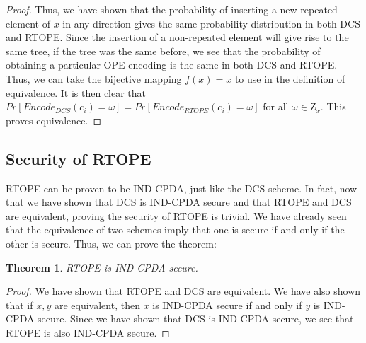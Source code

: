 \documentclass[12pt]{article}
\newtheorem{theorem}{Theorem}[section]
\begin{document}
\begin{proof}
    Thus, we have shown that the probability of inserting a new repeated element of $x$ in any direction gives the same probability distribution in both DCS and RTOPE. Since the insertion of a non-repeated element will give rise to the same tree, if the tree was the same before, we see that the probability of obtaining a particular OPE encoding is the same in both DCS and RTOPE. Thus, we can take the bijective mapping $f(x) = x$ to use in the definition of equivalence. It is then clear that $Pr[Encode_{DCS}(c_i) = \omega] = Pr[Encode_{RTOPE}(c_i) = \omega]$ for all $\omega \in \mathrm{Z}_x$. This proves equivalence.
\end{proof}

  \subsection{Security of RTOPE}

  RTOPE can be proven to be IND-CPDA, just like the DCS scheme. In fact, now that we have shown that DCS is IND-CPDA secure and that RTOPE and DCS are equivalent, proving the security of RTOPE is trivial. We have already seen that the equivalence of two schemes imply that one is secure if and only if the other is secure. Thus, we can prove the theorem:

  \begin{theorem}
    RTOPE is IND-CPDA secure.
  \end{theorem}
  \begin{proof}
    We have shown that RTOPE and DCS are equivalent. We have also shown that if $x,y$ are equivalent, then $x$ is IND-CPDA secure if and only if $y$ is IND-CPDA secure. Since we have shown that DCS is IND-CPDA secure, we see that RTOPE is also IND-CPDA secure.
  \end{proof}
\end{document}
